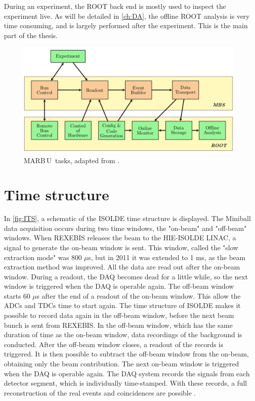 \documentclass[twoside,english]{uiofysmaster/uiofysmaster}
\newcommand{\MBOU}{MAR\belowbaseline[-2pt]{a}B\stackinset{l}{3pt}{b}{-3pt}{O}{O}\,U}
\let\orgautoref\autoref
\renewcommand{\autoref}
        {%
		 \def\sectionautorefname{Section}%
		 \def\subsectionautorefname{Section}%
		 \def\subsubsectionautorefname{Section}%
		 \def\chapterautorefname{Chapter}%
          \orgautoref}
\begin{document}
During an experiment, the ROOT back end is mostly used to inspect the experiment live. 
As will be detailed in \autoref{ch:DA}, the offline ROOT analysis is very time consuming, and is largely performed after the experiment. 
This is the main part of the thesis.

\begin{figure}[htb]
	\centering
	\includegraphics[width=\linewidth]{Images/MARaBOOU.png}
	\caption{\protect\MBOU\ tasks, adapted from \cite{Maraboou}.}
	\label{fig:MARaBOOU}
\end{figure}


\section{Time structure}\label{sec:time_structure}
In \autoref{fig:ITS}, a schematic of the ISOLDE time structure is displayed. 
The Miniball data acquisition occurs during two time windows, the "on-beam" and "off-beam" windows. 
When REXEBIS releases the beam to the HIE-ISOLDE LINAC, a signal to generate the on-beam window is sent. 
This window, called the "slow extraction mode" was 800 $\mu$s, but in 2011 it was extended to 1 ms, as the beam extraction method was improved. 
All the data are read out after the on-beam window. 
During a readout, the DAQ becomes dead for a little while, so the next window is triggered when the DAQ is operable again.
The off-beam window starts 60 $\mu$s after the end of a readout of the on-beam window.
This allow the ADCs and TDCs time to start again.
The time structure of ISOLDE makes it possible to record data again in the off-beam window, before the next beam bunch is sent from REXEBIS.
In the off-beam window, which has the same duration of time as the on-beam window, data recordings of the background is conducted.
After the off-beam window closes, a readout of the records is triggered.
It is then possible to subtract the off-beam window from the on-beam, obtaining only the beam contribution. 
The next on-beam window is triggered when the DAQ is operable again.
The DAQ system records the signals from each detector segment, which is individually time-stamped. 
With these records, a full reconstruction of the real events and coincidences are possible \cite{NWarr-el}. 
\end{document}
